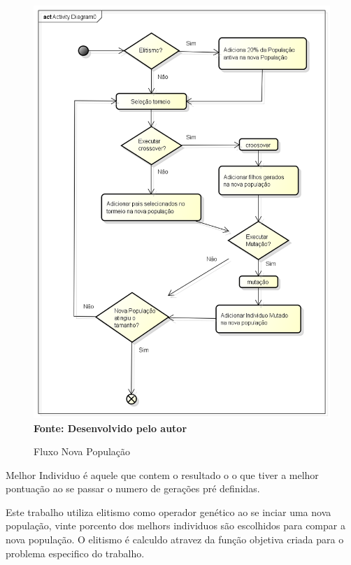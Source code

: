 \documentclass{abntpuc}
\begin{document}
\begin{figure}[!htb]
\caption[Fluxo Nova População]{Fluxo Nova População}
\label{fig:figura8}
\centering
\includegraphics[scale=0.5]{imagens/fluxoNovaPopulacao.png}
\\ \textbf{\footnotesize Fonte: Desenvolvido pelo autor}
\end{figure}

Melhor Individuo é aquele que contem o resultado o o que tiver a melhor pontuação ao se passar o numero de gerações pré definidas.


Este trabalho utiliza elitismo como operador genético ao se inciar uma nova população, vinte porcento dos melhors individuos são escolhidos para compar a nova população. O elitismo é calculdo atravez da função objetiva criada para o problema especifico do trabalho.\par
\end{document}
